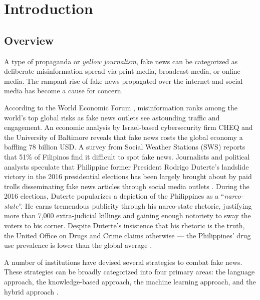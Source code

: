 \chapter{Introduction}
\label{sec:researchdesc}    %

\section{Overview}
\label{sec:overview}

A type of propaganda or \textit{yellow journalism}, fake news \cite{nyt-trump-lies} can be categorized as deliberate misinformation spread via print media, broadcast media, or online media. The rampant rise of fake news propagated over the internet and social media has become a cause for concern.

According to the World Economic Forum \cite{weforum-report}, misinformation ranks among the world's top global risks as fake news outlets see astounding traffic and engagement. An economic analysis by Israel-based cybersecurity firm CHEQ and the University of Baltimore \cite{pids-report} reveals that fake news costs the global economy a baffling 78 billion USD. A survey from Social Weather Stations (SWS) \cite{juan-felix-et-al-2023} reports that 51\% of Filipinos find it difficult to spot fake news. Journalists and political analysts speculate that Philippine former President Rodrigo Duterte's landslide victory in the 2016 presidential elections has been largely brought about by paid trolls disseminating fake news articles through social media outlets \cite{harvard-cyber-report}. During the 2016 elections, Duterte popularizes a depiction of the Philippines as a \enquote{\textit{narco-state}}\cite{demick2016duterte}. He earns tremendous publicity through his narco-state rhetoric, justifying more than 7,000 extra-judicial killings \cite{alconaba2016digong} and gaining enough notoriety to sway the voters to his corner. Despite Duterte's insistence that his rhetoric is the truth, the United Office on Drugs and Crime claims otherwise — the Philippines' drug use prevalence is lower than the global average \cite{yee2017posttruth}.

A number of institutions have devised several strategies to combat fake news. These strategies can be broadly categorized into four primary areas: the language approach, the knowledge-based approach, the machine learning approach, and the hybrid approach \cite{debeer2020approaches}.

